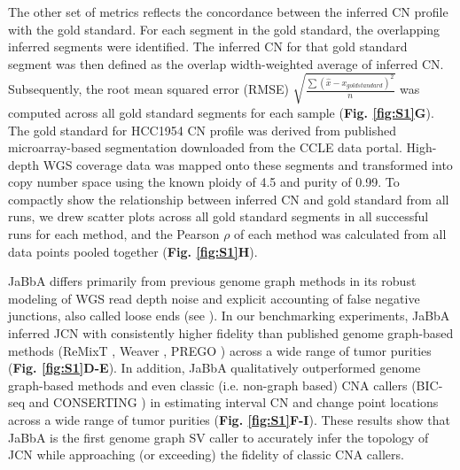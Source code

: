 \documentclass[phd,tocprelim]{cornell}
\begin{document}
The other set of metrics reflects the concordance between the inferred CN profile with the gold standard. For each segment in the gold standard, the overlapping inferred segments were identified. The inferred CN for that gold standard segment was then defined as the overlap width-weighted average of inferred CN. Subsequently, the root mean squared error (RMSE) $\sqrt{\frac{\sum{(\hat{x} - x_{goldstandard})^2}}{n}}$ was computed across all gold standard segments for each sample (\textbf{Fig. \ref{fig:S1}G}). The gold standard for HCC1954 CN profile was derived from published microarray-based segmentation downloaded from the CCLE data portal. High-depth WGS coverage data was mapped onto these segments and transformed into copy number space using the known ploidy of 4.5 and purity of 0.99. To compactly show the relationship between inferred CN and gold standard from all runs, we drew scatter plots across all gold standard segments in all successful runs for each method, and the Pearson $\rho$ of each method was calculated from all data points pooled together (\textbf{Fig. \ref{fig:S1}H}).


JaBbA differs primarily from previous genome graph methods in its robust modeling of WGS read depth noise and explicit accounting of false negative junctions, also called loose ends (see ). In our benchmarking experiments, JaBbA inferred JCN with consistently higher fidelity than published genome graph-based methods (ReMixT \cite{McPherson2017-ry}, Weaver \cite{Li2016-qa}, PREGO \cite{Oesper2012-vw}) across a wide range of tumor purities (\textbf{Fig. \ref{fig:S1}D-E}). In addition, JaBbA qualitatively outperformed genome graph-based methods and even classic (i.e. non-graph based) CNA callers (BIC-seq \cite{Xi2011-oa} and CONSERTING \cite{Chen2015-sw}) in estimating interval CN and change point locations across a wide range of tumor purities (\textbf{Fig. \ref{fig:S1}F-I}). These results show that JaBbA is the first genome graph SV caller to accurately infer the topology of JCN while approaching (or exceeding) the fidelity of classic CNA callers. 



\end{document}

